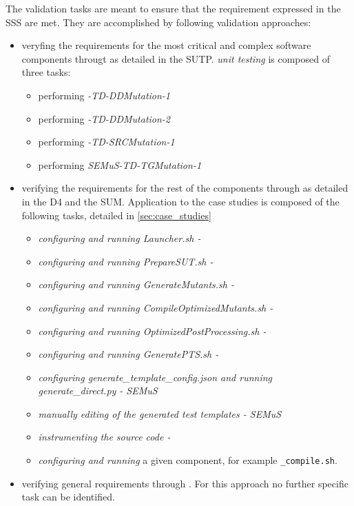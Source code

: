 The validation tasks are meant to ensure that the requirement expressed in the SSS are met.
They are accomplished by following validation approaches:
\begin{itemize}
  \item veryfing the requirements for the most critical and complex software components througt  as detailed in the SUTP.
  \emph{unit testing} is composed of three tasks:
  \begin{itemize}
    \item performing \emph{\DAMA-TD-DDMutation-1}
    \item performing \emph{\DAMA-TD-DDMutation-2}
    \item performing \emph{\MASS-TD-SRCMutation-1}
    \item performing \emph{SEMuS-TD-TGMutation-1}
  \end{itemize}
  \item verifying the requirements for the rest of the components through  as detailed in the D4 and the SUM.
  Application to the case studies is composed of the following tasks, detailed in \ref{sec:case_studies}
  \begin{itemize}
    \item \emph{configuring \MASS and running Launcher.sh - \MASS}
    \item \emph{configuring \MASS and running PrepareSUT.sh - \MASS}
    \item \emph{configuring \MASS and running GenerateMutants.sh - \MASS}
    \item \emph{configuring \MASS and running CompileOptimizedMutants.sh - \MASS}
    \item \emph{configuring \MASS and running OptimizedPostProcessing.sh - \MASS}
    \item \emph{configuring \MASS and running GeneratePTS.sh - \MASS}
    \item \emph{configuring generate\_template\_config.json and running generate\_direct.py - SEMuS}
    \item \emph{manually editing of the generated test templates - SEMuS} 
    \item \emph{instrumenting the source code - \DAMA}
    \item \emph{configuring and running} a given component, for example \texttt{\DAMA\_compile.sh}.
  \end{itemize}
  \item verifying general requirements through . For this approach no further specific task can be identified.
\end{itemize}



